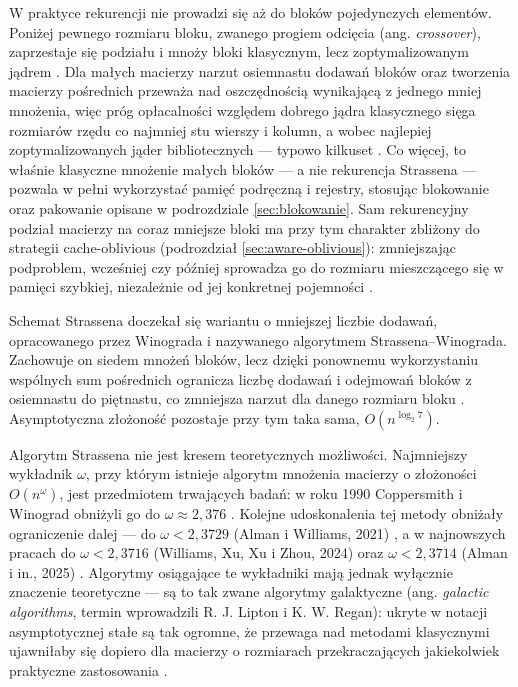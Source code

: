 \documentclass[a4paper,12pt]{book} %
\begin{document}
W praktyce rekurencji nie prowadzi się aż do bloków pojedynczych elementów. Poniżej pewnego rozmiaru bloku, zwanego progiem odcięcia (ang. \emph{crossover}), zaprzestaje się podziału i mnoży bloki klasycznym, lecz zoptymalizowanym jądrem \cite{higham1990exploiting}. Dla małych macierzy narzut osiemnastu dodawań bloków oraz tworzenia macierzy pośrednich przeważa nad oszczędnością wynikającą z jednego mniej mnożenia, więc próg opłacalności względem dobrego jądra klasycznego sięga rozmiarów rzędu co najmniej stu wierszy i kolumn, a wobec najlepiej zoptymalizowanych jąder bibliotecznych --- typowo kilkuset \cite{higham1990exploiting}. Co więcej, to właśnie klasyczne mnożenie małych bloków --- a nie rekurencja Strassena --- pozwala w pełni wykorzystać pamięć podręczną i rejestry, stosując blokowanie oraz pakowanie opisane w podrozdziale \ref{sec:blokowanie}. Sam rekurencyjny podział macierzy na coraz mniejsze bloki ma przy tym charakter zbliżony do strategii cache-oblivious (podrozdział \ref{sec:aware-oblivious}): zmniejszając podproblem, wcześniej czy później sprowadza go do rozmiaru mieszczącego się w pamięci szybkiej, niezależnie od jej konkretnej pojemności \cite{frigo1999cacheoblivious}.

Schemat Strassena doczekał się wariantu o mniejszej liczbie dodawań, opracowanego przez Winograda i nazywanego algorytmem Strassena--Winograda. Zachowuje on siedem mnożeń bloków, lecz dzięki ponownemu wykorzystaniu wspólnych sum pośrednich ogranicza liczbę dodawań i odejmowań bloków z osiemnastu do piętnastu, co zmniejsza narzut dla danego rozmiaru bloku \cite{higham1990exploiting}. Asymptotyczna złożoność pozostaje przy tym taka sama, $O\!\left(n^{\log_2 7}\right)$.

Algorytm Strassena nie jest kresem teoretycznych możliwości. Najmniejszy wykładnik $\omega$, przy którym istnieje algorytm mnożenia macierzy o złożoności $O\!\left(n^{\omega}\right)$, jest przedmiotem trwających badań: w roku 1990 Coppersmith i Winograd obniżyli go do $\omega \approx 2{,}376$ \cite{coppersmith1990matrix}. Kolejne udoskonalenia tej metody obniżały ograniczenie dalej --- do $\omega < 2{,}3729$ (Alman i Williams, 2021) \cite{alman2021refined}, a w najnowszych pracach do $\omega < 2{,}3716$ (Williams, Xu, Xu i Zhou, 2024) \cite{williams2024omega} oraz $\omega < 2{,}3714$ (Alman i in., 2025) \cite{alman2025omega}. Algorytmy osiągające te wykładniki mają jednak wyłącznie znaczenie teoretyczne --- są to tak zwane algorytmy galaktyczne (ang. \emph{galactic algorithms}, termin wprowadzili R. J. Lipton i K. W. Regan): ukryte w notacji asymptotycznej stałe są tak ogromne, że przewaga nad metodami klasycznymi ujawniłaby się dopiero dla macierzy o rozmiarach przekraczających jakiekolwiek praktyczne zastosowania \cite{alman2021refined}.
\end{document}
